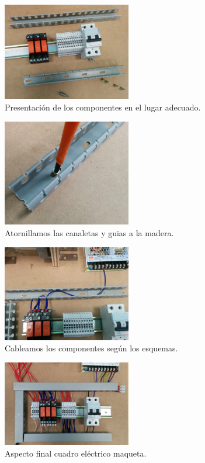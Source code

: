     \begin{figure}[H]
            \centering
            \includegraphics[width=0.5\textwidth]{images/maqueta/IMG_20150324_162200.jpg}
            \caption{Presentación de los componentes en el lugar adecuado.}
            \label{fig:maque_montaje5}
    \end{figure}
    \begin{figure}[H]
            \centering
            \includegraphics[width=0.5\textwidth]{images/maqueta/IMG_20150324_162705.jpg}
            \caption{Atornillamos las canaletas y guias a la madera.}
            \label{fig:maque_montaje6}
    \end{figure}
    \begin{figure}[H]
            \centering
            \includegraphics[width=0.5\textwidth]{images/maqueta/IMG_20150324_173716.jpg}
            \caption{Cableamos los componentes según los esquemas.}
            \label{fig:maque_montaje7}
    \end{figure}
    \begin{figure}[H]
            \centering
            \includegraphics[width=0.5\textwidth]{images/maqueta/IMG_20150331_125243.jpg}
            \caption{Aspecto final cuadro eléctrico maqueta.}
            \label{fig:maque_montaje8}
    \end{figure}